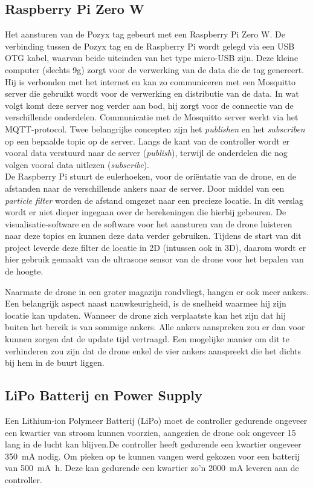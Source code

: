 \subsection{Raspberry Pi Zero W} \label{sec:zerow}
Het aansturen van de Pozyx tag gebeurt met een Raspberry Pi Zero W. De verbinding tussen de Pozyx tag en de Raspberry Pi wordt gelegd via een USB OTG kabel, waarvan beide uiteinden van het type micro-USB zijn. Deze kleine computer (slechts 9g) zorgt voor de verwerking van de data die de tag genereert. Hij is verbonden met het internet en kan zo communiceren met een Mosquitto server die gebruikt wordt voor de verwerking en distributie van de data. In wat volgt komt deze server nog verder aan bod, hij zorgt voor de connectie van de verschillende onderdelen. Communicatie met de Mosquitto server werkt via het MQTT-protocol. Twee belangrijke concepten zijn het \textit{publishen} en het \textit{subscriben} op een bepaalde topic op de server. Langs de kant van de controller wordt er vooral data verstuurd naar de server (\textit{publish}), terwijl de onderdelen die nog volgen vooral data uitlezen (\textit{subscribe}). \\

De Raspberry Pi stuurt de eulerhoeken, voor de ori\"entatie van de drone, en de afstanden naar de verschillende ankers naar de server. Door middel van een \textit{particle filter} worden de afstand omgezet naar een precieze locatie. In dit verslag wordt er niet dieper ingegaan over de berekeningen die hierbij gebeuren. De visualisatie-software en de software voor het aansturen van de drone luisteren naar deze topics en kunnen deze data verder gebruiken. Tijdens de start van dit project leverde deze filter de locatie in 2D (intussen ook in 3D), daarom wordt er hier gebruik gemaakt van de ultrasone sensor van de drone voor het bepalen van de hoogte.

Naarmate de drone in een groter magazijn rondvliegt, hangen er ook meer ankers. Een belangrijk aspect naast nauwkeurigheid, is de snelheid waarmee hij zijn locatie kan updaten. Wanneer de drone zich verplaatste kan het zijn dat hij buiten het bereik is van sommige ankers. Alle ankers aanspreken zou er dan voor kunnen zorgen dat de update tijd vertraagd. Een mogelijke manier om dit te verhinderen zou zijn dat de drone enkel de vier ankers aanspreekt die het dichts bij hem in de buurt liggen.

\subsection{LiPo Batterij en Power Supply} \label{sec:lipo}
Een Lithium-ion Polymeer Batterij (LiPo) moet de controller gedurende ongeveer een kwartier van stroom kunnen voorzien, aangezien de drone ook ongeveer \SI{15}{\min} lang in de lucht kan blijven.De controller heeft gedurende een kwartier ongeveer \SI{350}{\mA} nodig. Om pieken op te kunnen vangen werd gekozen voor een batterij van \SI{500}{\mA\hour}. Deze kan gedurende een kwartier zo'n \SI{2000}{\mA} leveren aan de controller.\\

